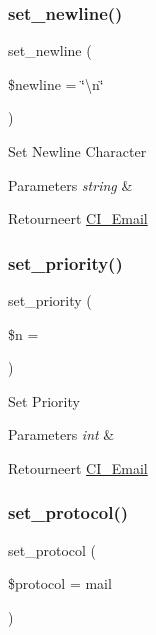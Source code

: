 \subsubsection{\texorpdfstring{set\_newline()}{set\_newline()}}
{\footnotesize\ttfamily set\+\_\+newline (\begin{DoxyParamCaption}\item[{}]{\$newline = {\ttfamily \char`\"{}\textbackslash{}n\char`\"{}} }\end{DoxyParamCaption})}

Set Newline Character


\begin{DoxyParams}{Parameters}
{\em string} & \\
\hline
\end{DoxyParams}
\begin{DoxyReturn}{Retourneert}
\mbox{\hyperlink{class_c_i___email}{C\+I\+\_\+\+Email}} 
\end{DoxyReturn}
\mbox{\label{class_c_i___email_aee3ae37c0bf5f8aca34f6e872efd66b8}} 
\subsubsection{\texorpdfstring{set\_priority()}{set\_priority()}}
{\footnotesize\ttfamily set\+\_\+priority (\begin{DoxyParamCaption}\item[{}]{\$n = {} }\end{DoxyParamCaption})}

Set Priority


\begin{DoxyParams}{Parameters}
{\em int} & \\
\hline
\end{DoxyParams}
\begin{DoxyReturn}{Retourneert}
\mbox{\hyperlink{class_c_i___email}{C\+I\+\_\+\+Email}} 
\end{DoxyReturn}
\mbox{\label{class_c_i___email_a7be40507898a21ce9172b225e973b107}} 
\subsubsection{\texorpdfstring{set\_protocol()}{set\_protocol()}}
{\footnotesize\ttfamily set\+\_\+protocol (\begin{DoxyParamCaption}\item[{}]{\$protocol = {\ttfamily \textquotesingle{}mail\textquotesingle{}} }\end{DoxyParamCaption})}

